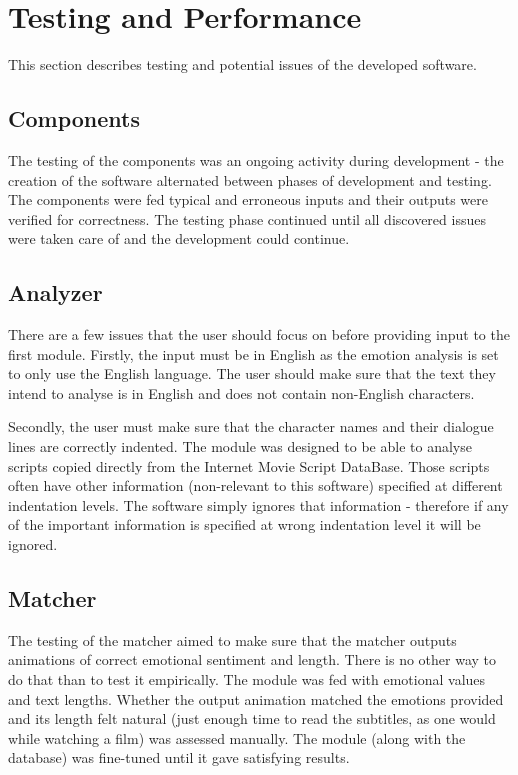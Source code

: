 \chapter{Testing and Performance \label{chap:testingperf}}

This section describes testing and potential issues of the developed software.

\section{Components}
The testing of the components was an ongoing activity during development - the creation of the software alternated between phases of development and testing. The components were fed typical and erroneous inputs and their outputs were verified for correctness. The testing phase continued until all discovered issues were taken care of and the development could continue.

\section{Analyzer}
There are a few issues that the user should focus on before providing input to the first module. Firstly, the input must be in English as the emotion analysis is set to only use the English language. The user should make sure that the text they intend to analyse is in English and does not contain non-English characters.

Secondly, the user must make sure that the character names and their dialogue lines are correctly indented. The module was designed to be able to analyse scripts copied directly from the Internet Movie Script DataBase. Those scripts often have other information (non-relevant to this software) specified at different indentation levels. The software simply ignores that information - therefore if any of the important information is specified at wrong indentation level it will be ignored.

\section{Matcher}
The testing of the matcher aimed to make sure that the matcher outputs animations of correct emotional sentiment and length. There is no other way to do that than to test it empirically. The module was fed with emotional values and text lengths. Whether the output animation matched the emotions provided and its length felt natural (just enough time to read the subtitles, as one would while watching a film) was assessed manually. The module (along with the database) was fine-tuned until it gave satisfying results.

